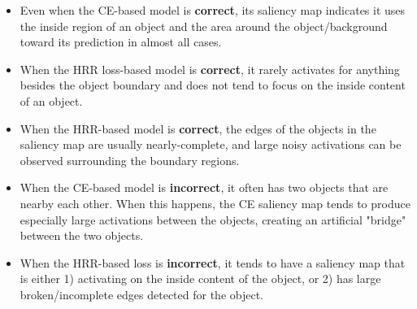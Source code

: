 \documentclass[letterpaper]{article} %
\begin{document}
\begin{itemize}[leftmargin=20pt, topsep=0pt]
\item Even when the CE-based model is \textbf{correct}, its saliency map indicates it uses the inside region of an object and the area around the object/background toward its prediction in almost all cases.
\item When the HRR loss-based model is \textbf{correct}, it rarely activates for anything besides the object boundary and does not tend to focus on the inside content of an object.
\item When the HRR-based model is \textbf{correct}, the edges of the objects in the saliency map are usually nearly-complete, and large noisy activations can be observed surrounding the boundary regions.
\item When the CE-based model is \textbf{incorrect}, it often has two objects that are nearby each other. When this happens, the CE saliency map tends to produce especially large activations between the objects, creating an artificial "bridge" between the two objects.
\item When the HRR-based loss is \textbf{incorrect}, it tends to have a saliency map that is either 1) activating on the inside content of the object, or 2) has large broken/incomplete edges detected for the object.
\end{itemize}

\end{document}
